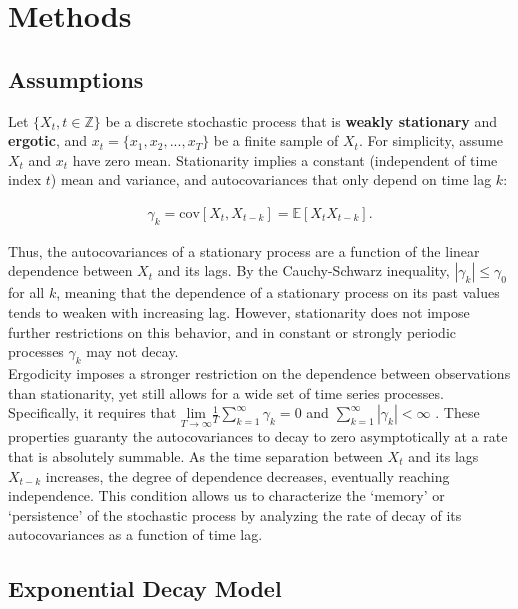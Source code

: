 \documentclass[main.tex]{subfiles}
\begin{document}
\section{Methods}

\subsection{Assumptions}

Let $\{X_t, t\in \mathbb{Z}\}$ be a discrete stochastic process that is \textbf{weakly stationary} and \textbf{ergotic}, and $x_t = \{x_1, x_2, ..., x_T\}$ be a finite sample of $X_t$. For simplicity, assume $X_t$ and $x_t$ have zero mean. Stationarity implies a constant (independent of time index $t$) mean and variance, and autocovariances that only depend on time lag $k$:

\begin{align*}
    \gamma_k = \text{cov}[X_t, X_{t-k}] = \mathbb{E}[X_t X_{t-k}].
\end{align*}

Thus, the autocovariances of a stationary process are a function of the linear dependence between $X_t$ and its lags. By the Cauchy-Schwarz inequality, $|\gamma_k|\le \gamma_0$ for all $k$, meaning that the dependence of a stationary process on its past values tends to weaken with increasing lag. However, stationarity does not impose further restrictions on this behavior, and in constant or strongly periodic processes $\gamma_k$ may not decay.\\

Ergodicity imposes a stronger restriction on the dependence between observations than stationarity, yet still allows for a wide set of time series processes. Specifically, it requires that $\underset{T\to\infty}{\text{lim}} \frac{1}{T} \sum_{k=1}^\infty \gamma_k = 0$ and $\sum_{k=1}^\infty |\gamma_k| < \infty$ \cite{hansen_econometrics_2022}. These properties guaranty the autocovariances to decay to zero asymptotically at a rate that is absolutely summable. As the time separation between $X_t$ and its lags $X_{t-k}$ increases, the degree of dependence decreases, eventually reaching independence. This condition allows us to characterize the `memory' or `persistence' of the stochastic process by analyzing the rate of decay of its autocovariances as a function of time lag.

\subsection{Exponential Decay Model}
\end{document}
